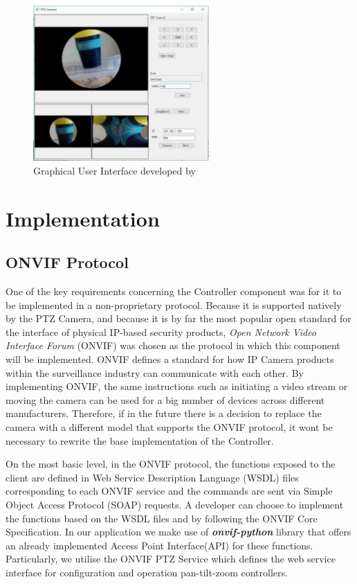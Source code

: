 \documentclass{l4proj}
\begin{document}
\begin{figure}[ht]
    \centering
    \includegraphics[width=0.6\textwidth]{l4template-master/images/old_gui_temp.png}
    \caption{Graphical User Interface developed by \cite{JianwenZhou}}
    \label{oldgui}
\end{figure}


\chapter{Implementation}
\section{ONVIF Protocol}

One of the key requirements concerning the Controller component was for it to be implemented in a non-proprietary protocol. Because it is supported natively by the PTZ Camera, and because it is by far the most popular open standard for the interface of physical IP-based security products, \textit{Open Network Video Interface Forum} (ONVIF) was chosen as the protocol in which this component will be implemented. ONVIF defines a standard for how IP Camera products within the surveillance industry can communicate with each other. By implementing ONVIF, the same instructions such as initiating a video stream or moving the camera can be used for a big number of devices across different manufacturers. Therefore, if in the future there is a decision to replace the camera with a different model that supports the ONVIF protocol, it wont be necessary to rewrite the base implementation of the Controller. 


On the most basic level, in the ONVIF protocol, the functions exposed to the client are defined in Web Service Description Language (WSDL) files corresponding to each ONVIF service and the commands are sent via Simple Object Access Protocol (SOAP) requests. A developer can choose to implement the functions based on the WSDL files and by following the ONVIF Core Specification. In our application we make use of
\textbf{\textit{onvif-python}} library that offers an already implemented Access Point Interface(API) for these functions. Particularly, we utilise the ONVIF PTZ Service which defines the web service interface for configuration and operation pan-tilt-zoom controllers. 
\end{document}
